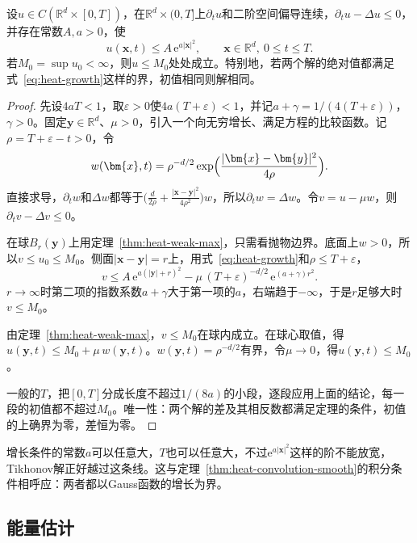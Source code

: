 \begin{theorem}[全空间的最大值原理]
\label{thm:heat-whole-max}
设$u\in C(\mathbb{R}^{d}\times[0,T])$，在$\mathbb{R}^{d}\times(0,T]$上$\partial_tu$和二阶空间偏导连续，$\partial_tu-\Delta u\leq0$，并存在常数$A,a>0$，使
\begin{equation}
 u(\bm{x},t)\leq A\,\mathrm{e}^{a\lvert\bm{x}\rvert^2},\qquad \bm{x}\in\mathbb{R}^{d},\ 0\leq t\leq T .
 \label{eq:heat-growth}
\end{equation}
若$M_0=\sup u_0<\infty$，则$u\leq M_0$处处成立。特别地，若两个解的绝对值都满足式~\eqref{eq:heat-growth}这样的界，初值相同则解相同。
\end{theorem}

\begin{proof}
先设$4aT<1$，取$\varepsilon>0$使$4a(T+\varepsilon)<1$，并记$a+\gamma=1/(4(T+\varepsilon))$，$\gamma>0$。固定$\bm{y}\in\mathbb{R}^{d}$、$\mu>0$，引入一个向无穷增长、满足方程的比较函数。记$\rho=T+\varepsilon-t>0$，令
\[
 w(\bm{x},t)=\rho^{-d/2}\exp\Bigl(\frac{\lvert\bm{x}-\bm{y}\rvert^2}{4\rho}\Bigr) .
\]
直接求导，$\partial_tw$和$\Delta w$都等于$\bigl(\tfrac{d}{2\rho}+\tfrac{\lvert\bm{x}-\bm{y}\rvert^2}{4\rho^2}\bigr)w$，所以$\partial_tw=\Delta w$。令$v=u-\mu w$，则$\partial_tv-\Delta v\leq0$。

在球$B_r(\bm{y})$上用定理~\ref{thm:heat-weak-max}，只需看抛物边界。底面上$w>0$，所以$v\leq u_0\leq M_0$。侧面$\lvert\bm{x}-\bm{y}\rvert=r$上，用式~\eqref{eq:heat-growth}和$\rho\leq T+\varepsilon$，
\[
 v\leq A\,\mathrm{e}^{a(\lvert\bm{y}\rvert+r)^2}-\mu\,(T+\varepsilon)^{-d/2}\,\mathrm{e}^{(a+\gamma)r^2} .
\]
$r\to\infty$时第二项的指数系数$a+\gamma$大于第一项的$a$，右端趋于$-\infty$，于是$r$足够大时$v\leq M_0$。

由定理~\ref{thm:heat-weak-max}，$v\leq M_0$在球内成立。在球心取值，得$u(\bm{y},t)\leq M_0+\mu\,w(\bm{y},t)$。$w(\bm{y},t)=\rho^{-d/2}$有界，令$\mu\to0$，得$u(\bm{y},t)\leq M_0$。

一般的$T$，把$[0,T]$分成长度不超过$1/(8a)$的小段，逐段应用上面的结论，每一段的初值都不超过$M_0$。唯一性：两个解的差及其相反数都满足定理的条件，初值的上确界为零，差恒为零。
\end{proof}

增长条件的常数$a$可以任意大，$T$也可以任意大，不过$\mathrm{e}^{a\lvert\bm{x}\rvert^2}$这样的阶不能放宽，Tikhonov解正好越过这条线。这与定理~\ref{thm:heat-convolution-smooth}的积分条件相呼应：两者都以Gauss函数的增长为界。

\subsection{能量估计}
\label{sec:heat-energy}


